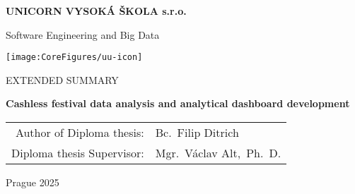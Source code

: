 \pagestyle{empty}
\begin{center}

{\bfseries\large UNICORN VYSOKÁ ŠKOLA s.r.o.}

	\vspace{3mm}

	{\Large Software Engineering and Big Data}

	\vfill
	\vspace{3mm}

	\centerline{\mbox{\texttt{[image: \\CoreFigures/uu-icon]}}}

	\vfill
	\vspace{3mm}

	{\normalsize\MakeUppercase{Extended Summary}}

	\vspace{6mm}

	{\LARGE\bfseries Cashless festival data analysis and analytical dashboard development}

	\vfill

	\begin{tabular}{rl}
		Author of Diploma thesis:  & Bc.~Filip Ditrich       \\
		\noalign{\vspace{2mm}}
		Diploma thesis Supervisor: & Mgr.~Václav Alt,~Ph.~D. \\
	\end{tabular}

	\vfill

	Prague 2025

\end{center}
